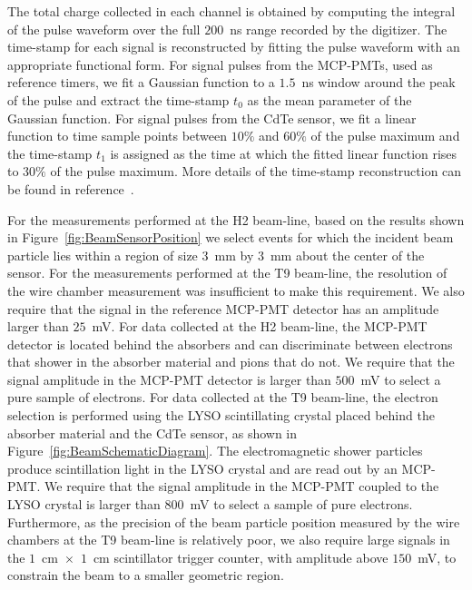 The total charge collected in each channel is obtained by computing the integral of the pulse
waveform over the full $200$~ns range recorded by the digitizer. 
The time-stamp for each signal is reconstructed by fitting the pulse waveform with
an appropriate functional form. For signal pulses from the MCP-PMTs, used as reference timers, 
we fit a Gaussian function to a $1.5$~ns window around the peak of the pulse and extract the 
time-stamp $t_{0}$ as the mean parameter of the Gaussian function. For signal pulses from the
CdTe sensor, we fit a linear function to time sample points between $10\%$ and $60\%$ of the pulse
maximum and the time-stamp $t_{1}$ is assigned as the time at which the fitted linear function
rises to $30\%$ of the pulse maximum. More details of the time-stamp reconstruction can be
found in reference~\cite{Anderson:2015gha}.


For the measurements performed at the H2 beam-line, 
based on the results shown in Figure~\ref{fig:BeamSensorPosition} we select events
for which the incident beam particle lies within a region of size $3$~mm by $3$~mm 
about the center of the sensor. For the measurements performed at the T9 beam-line,
the resolution of the wire chamber measurement was insufficient to make this 
requirement. We also require that the 
signal in the reference MCP-PMT detector has an amplitude larger than $25$~mV. 
For data collected at the H2 beam-line, the MCP-PMT detector is located behind
the absorbers and can discriminate between electrons that shower in the absorber
material and pions that do not. We require that the signal amplitude in the 
MCP-PMT detector is larger than $500$~mV to select a pure sample of electrons. For
data collected at the T9 beam-line, the electron selection is performed using
the LYSO scintillating crystal placed behind the absorber material and the CdTe sensor,
as shown in Figure~\ref{fig:BeamSchematicDiagram}. The electromagnetic shower particles produce
scintillation light in the LYSO crystal and are read out by an MCP-PMT. We require that
the signal amplitude in the MCP-PMT coupled to the LYSO crystal is larger than $800$~mV
to select a sample of pure electrons. Furthermore, as the precision of the beam particle position 
measured by the wire chambers at the T9 beam-line is relatively poor, we also require
large signals in the $1$~cm~$\times$~$1$~cm scintillator trigger counter, with
amplitude above $150$~mV, to constrain the beam to a smaller geometric region. 
